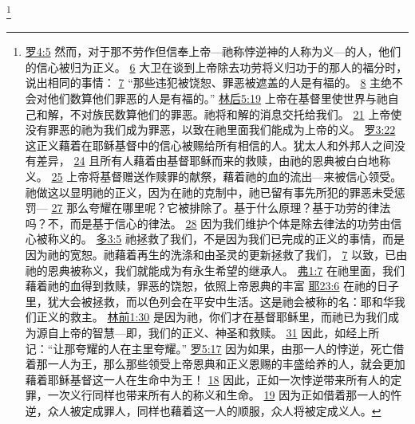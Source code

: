 \documentclass[12pt, a4paper, oneside]{ctexart}
\begin{document}
	\footnote {
		\href{https://biblehub.com/romans/4-5.htm}{罗4:5} 然而，对于那不劳作但信奉上帝---祂称悖逆神的人称为义---的人，他们的信心被归为正义。
		\href{https://biblehub.com/romans/4-6.htm}{6} 大卫在谈到上帝除去功劳将义归功于的那人的福分时，说出相同的事情：
		\href{https://biblehub.com/romans/4-7.htm}{7} “那些违犯被饶恕、罪恶被遮盖的人是有福的。
		\href{https://biblehub.com/romans/4-8.htm}{8} 主绝不会对他们数算他们罪恶的人是有福的。”
		\href{https://biblehub.com/2_corinthians/5-19.htm}{林后5:19} 上帝在基督里使世界与祂自己和解，不对族民数算他们的罪恶。祂将和解的消息交托给我们。
		\href{https://biblehub.com/2_corinthians/5-21.htm}{21} 上帝使没有罪恶的祂为我们成为罪恶，以致在祂里面我们能成为上帝的义。
		\href{https://biblehub.com/romans/3-22.htm}{罗3:22} 这正义藉着在耶稣基督中的信心被赐给所有相信的人。犹太人和外邦人之间没有差异，
		\href{https://biblehub.com/romans/3-24.htm}{24} 且所有人藉着由基督耶稣而来的救赎，由祂的恩典被白白地称义。
		\href{https://biblehub.com/romans/3-25.htm}{25} 上帝将基督赠送作赎罪的献祭，藉着祂的血的流出---来被信心领受。祂做这以显明祂的正义，因为在祂的克制中，祂已留有事先所犯的罪恶未受惩罚---
		\href{https://biblehub.com/romans/3-27.htm}{27} 那么夸耀在哪里呢？它被排除了。基于什么原理？基于功劳的律法吗？不，而是基于信心的律法。
		\href{https://biblehub.com/romans/3-28.htm}{28} 因为我们维护个体是除去律法的功劳由信心被称义的。
		\href{https://biblehub.com/titus/3-5.htm}{多3:5} 祂拯救了我们，不是因为我们已完成的正义的事情，而是因为祂的宽恕。祂藉着再生的洗涤和由圣灵的更新拯救了我们，
		\href{https://biblehub.com/titus/3-7.htm}{7} 以致，已由祂的恩典被称义，我们就能成为有永生希望的继承人。
        \href{https://biblehub.com/ephesians/1-7.htm}{弗1:7} 在祂里面，我们藉着祂的血得到救赎，罪恶的饶恕，依照上帝恩典的丰富
		\href{https://biblehub.com/jeremiah/23-6.htm}{耶23:6} 在祂的日子里，犹大会被拯救，而以色列会在平安中生活。这是祂会被称的名：耶和华我们正义的救主。
		\href{https://biblehub.com/1_corinthians/1-30.htm}{林前1:30} 是因为祂，你们才在基督耶稣里，而祂已为我们成为源自上帝的智慧---即，我们的正义、神圣和救赎。
		\href{https://biblehub.com/1_corinthians/1-31.htm}{31} 因此，如经上所记：“让那夸耀的人在主里夸耀。”
        \href{https://biblehub.com/romans/5-17.htm}{罗5:17} 因为如果，由那一人的悖逆，死亡借着那一人为王，那么那些领受上帝恩典和正义恩赐的丰盛给养的人，就会更加藉着耶稣基督这一人在生命中为王！
		\href{https://biblehub.com/romans/5-18.htm}{18} 因此，正如一次悖逆带来所有人的定罪，一次义行同样也带来所有人的称义和生命。
		\href{https://biblehub.com/romans/5-19.htm}{19} 因为正如借着那一人的忤逆，众人被定成罪人，同样也藉着这一人的顺服，众人将被定成义人。
	}
\end{document}
